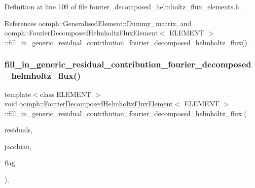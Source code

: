 Definition at line 109 of file fourier\+\_\+decomposed\+\_\+helmholtz\+\_\+flux\+\_\+elements.\+h.



References oomph\+::\+Generalised\+Element\+::\+Dummy\+\_\+matrix, and oomph\+::\+Fourier\+Decomposed\+Helmholtz\+Flux\+Element$<$ E\+L\+E\+M\+E\+N\+T $>$\+::fill\+\_\+in\+\_\+generic\+\_\+residual\+\_\+contribution\+\_\+fourier\+\_\+decomposed\+\_\+helmholtz\+\_\+flux().

\mbox{\label{classoomph_1_1FourierDecomposedHelmholtzFluxElement_ac1f295a6b98d41706b92f5af363d16a0}} 
\subsubsection{\texorpdfstring{fill\+\_\+in\+\_\+generic\+\_\+residual\+\_\+contribution\+\_\+fourier\+\_\+decomposed\+\_\+helmholtz\+\_\+flux()}{fill\_in\_generic\_residual\_contribution\_fourier\_decomposed\_helmholtz\_flux()}}
{\footnotesize\ttfamily template$<$class E\+L\+E\+M\+E\+NT $>$ \\
void \hyperlink{classoomph_1_1FourierDecomposedHelmholtzFluxElement}{oomph\+::\+Fourier\+Decomposed\+Helmholtz\+Flux\+Element}$<$ E\+L\+E\+M\+E\+NT $>$\+::fill\+\_\+in\+\_\+generic\+\_\+residual\+\_\+contribution\+\_\+fourier\+\_\+decomposed\+\_\+helmholtz\+\_\+flux (\begin{DoxyParamCaption}\item[{\hyperlink{classoomph_1_1Vector}{Vector}$<$ double $>$ \&}]{residuals,  }\item[{\hyperlink{classoomph_1_1DenseMatrix}{Dense\+Matrix}$<$ double $>$ \&}]{jacobian,  }\item[{const unsigned \&}]{flag }\end{DoxyParamCaption})\hspace{0.3cm}{\ttfamily [protected]}, {\ttfamily [virtual]}}



